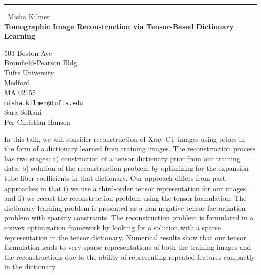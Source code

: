 \documentclass{report}
\begin{document}
\begin{center}
\rule{6in}{1pt} \
{\large Misha Kilmer \\
{\bf Tomographic Image Reconstruction via Tensor-Based Dictionary Learning}}

503 Boston Ave  \\ Bromfield-Pearson Bldg \\ Tufts University \\ Medford \\ MA 02155
\\
{\tt misha.kilmer@tufts.edu}\\
Sara Soltani\\
Per Christian Hansen\end{center}

In this talk, we will consider reconstruction of Xray CT images using
priors in the form of a dictionary learned from training images. The
reconstruction process has two stages: a) construction of a tensor
dictionary prior from our training data; b) solution of the
reconstruction problem by optimizing for the expansion tube fiber
coefficients in that dictionary. Our approach differs from past
approaches in that i) we use a third-order tensor representation for our
images and ii) we recast the reconstruction problem using the tensor
formulation. The dictionary learning problem is presented as a
non-negative tensor factorization problem with sparsity constraints. The
reconstruction problem is formulated in a convex optimization framework
by looking for a solution with a sparse representation in the tensor
dictionary. Numerical results show that our tensor formulation leads to
very sparse representations of both the training images and the
reconstructions due to the ability of representing repeated features
compactly in the dictionary.
\end{document}
